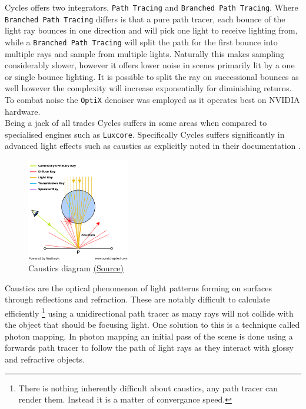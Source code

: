 \documentclass[11pt]{article}
\begin{document}
Cycles offers two integrators, \texttt{Path Tracing} and \texttt{Branched Path Tracing}. Where
\texttt{Branched Path Tracing}  differs is that a pure path tracer, each bounce of the
light ray bounces in one direction and will pick one light to receive lighting
from, while a \texttt{Branched Path Tracing} will split the path for the first bounce
into multiple rays and sample from multiple lights. Naturally this makes
sampling considerably slower, however it offers lower noise in scenes primarily
lit by a one or single bounce lighting. It is possible to split the ray on
successional bounces as well however the complexity will increase exponentially
for diminishing returns.\\

To combat noise the \texttt{OptiX} denoiser was employed as it operates best on NVIDIA
hardware.\\

Being a jack of all trades Cycles suffers in some areas when compared to
specialised engines such as \texttt{Luxcore}. Specifically Cycles suffers significantly
in advanced light effects such as caustics as explicitly noted in their
documentation \cite{blender-sampling}.\\

\begin{figure}[htbp]
\centering
\includegraphics[width=0.4\textwidth]{Images/caustics2.png}
\caption{\label{caustics}Caustics diagram \href{https://www.scratchapixel.com/lessons/3d-basic-rendering/global-illumination-path-tracing}{(Source)}}
\end{figure}
Caustics are the optical phenomenon of light patterns forming on surfaces
through reflections and refraction. These are notably difficult to calculate
efficiently \footnote{There is nothing inherently difficult about caustics, any path tracer can
render them. Instead it is a matter of convergance speed.} using a unidirectional path tracer as many rays will not
collide with the object that should be focusing light. One solution to this is a
technique called photon mapping. In photon mapping an initial pass of the scene
is done using a forwards path tracer to follow the path of light rays as they
interact with glossy and refractive objects.\\
\end{document}
